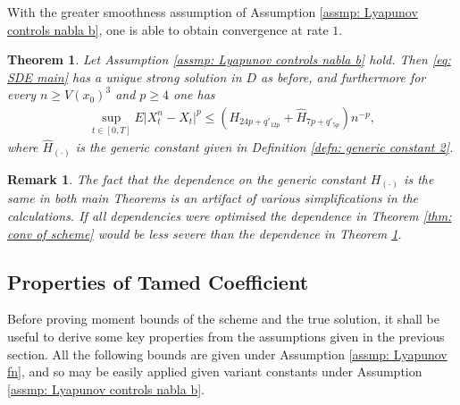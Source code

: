 \documentclass{article}
\newtheorem{thm}{Theorem}
\newtheorem{rem}{Remark}
\begin{document}
     With the greater smoothness assumption of Assumption \ref{assmp: Lyapunov controls nabla b}, one is able to obtain convergence at rate $1$.
     \begin{thm}\label{thm: conv of scheme 2}
         Let Assumption \ref{assmp: Lyapunov controls nabla b} hold. Then \eqref{eq: SDE main} has a unique strong solution in $D$ as before, and furthermore for every $n \geq V(x_0)^3$ and $p\geq 4$ one has
           \begin{align}
       \sup_{t\in [0,T]} E\lvert X^n_t-X_t\rvert^p \leq (H_{24p+q'_{12p}}+\hat{H}_{7p+q'_{5p}})n^{-p},
    \end{align}
    where $\hat{H}_{(\cdot)}$ is the generic constant given in Definition \ref{defn: generic constant 2}.
     \end{thm}
     \begin{rem}
The fact that the dependence on the generic constant $H_{(\cdot)}$ is the same in both main Theorems is an artifact of various simplifications in the calculations. If all dependencies were optimised the dependence in Theorem \ref{thm: conv of scheme} would be less severe than the dependence in Theorem \ref{thm: conv of scheme 2}.
     \end{rem}
     \subsection{Properties of Tamed Coefficient}
Before proving moment bounds of the scheme and the true solution, it shall be useful to derive some key properties from the assumptions given in the previous section. All the following bounds are given under Assumption \ref{assmp: Lyapunov fn}, and so may be easily applied given variant constants under Assumption \ref{assmp: Lyapunov controls nabla b}.
\end{document}
